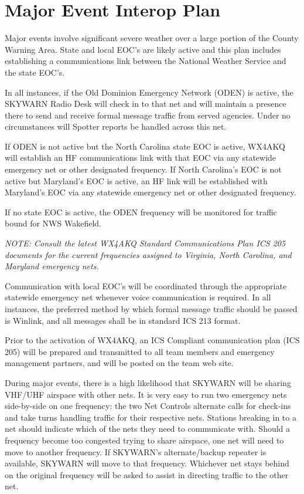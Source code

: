 \documentclass[pdflatex,letterpaper,twoside,12pt]{book}
\begin{document}
\section{Major Event Interop Plan}

Major events involve significant severe weather over a large portion of the County Warning Area.  State and local EOC's are likely active and this plan includes establishing a communications link between the National Weather Service and the state EOC's.

In all instances, if the Old Dominion Emergency Network (ODEN) is active, the SKYWARN Radio Desk will check in to that net and will maintain a presence there to send and receive formal message traffic from served agencies.  Under no circumstances will Spotter reports be handled across this net.

If ODEN is not active but the North Carolina state EOC is active, WX4AKQ will establish an HF communications link with that EOC via any statewide emergency net or other designated frequency.  If North Carolina's EOC is not active but Maryland's EOC is active, an HF link will be established with Maryland's EOC via any statewide emergency net or other designated frequency.

If no state EOC is active, the ODEN frequency will be monitored for traffic bound for NWS Wakefield.

\emph{NOTE: Consult the latest WX4AKQ Standard Communications Plan ICS 205 documents for the current frequencies assigned to Virginia, North Carolina, and Maryland emergency nets.}

Communication with local EOC's will be coordinated through the appropriate statewide emergency net whenever voice communication is required.  In all instances, the preferred method by which formal message traffic should be passed is Winlink, and all messages shall be in standard ICS 213 format.

Prior to the activation of WX4AKQ, an ICS Compliant communication plan (ICS 205) will be prepared and transmitted to all team members and emergency management partners, and will be posted on the team web site.

During major events, there is a high likelihood that SKYWARN will be sharing VHF/UHF airspace with other nets.  It is very easy to run two emergency nets side-by-side on one frequency:  the two Net Controls alternate calls for check-ins and take turns handling traffic for their respective nets.  Stations breaking in to a net should indicate which of the nets they need to communicate with.  Should a frequency become too congested trying to share airspace, one net will need to move to another frequency.  If SKYWARN's alternate/backup repeater is available, SKYWARN will move to that frequency.  Whichever net stays behind on the original frequency will be asked to assist in directing traffic to the other net.
\end{document}
